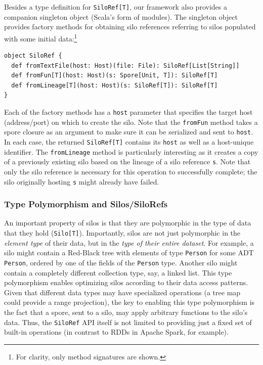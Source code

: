 \documentclass{jfp1}
\begin{document}
Besides a type definition for \verb|SiloRef[T]|, our framework also provides a
companion singleton object (Scala's form of modules). The singleton object
provides factory methods for obtaining silo references referring to silos populated
with some initial data:\footnote{For clarity, only method signatures are shown.}

\begin{lstlisting}
object SiloRef {
  def fromTextFile(host: Host)(file: File): SiloRef[List[String]]
  def fromFun[T](host: Host)(s: Spore[Unit, T]): SiloRef[T]
  def fromLineage[T](host: Host)(s: SiloRef[T]): SiloRef[T]
}
\end{lstlisting}
\noindent
Each of the factory methods has a \verb|host| parameter that specifies the
target host (address/port) on which to create the silo. Note that the
\verb|fromFun| method takes a spore closure as an argument to make sure it can
be serialized and sent to \verb|host|. In each case, the returned
\verb|SiloRef[T]| contains its \verb|host| as well as a
host-unique identifier. The \verb|fromLineage| method is
particularly interesting as it creates a copy of a previously existing silo
based on the lineage of a silo reference \verb|s|. Note that only the silo
reference is necessary for this operation to successfully complete; the silo
originally hosting \verb|s| might already have failed.

\subsubsection{Type Polymorphism and Silos/SiloRefs}

An important property of silos is that they are polymorphic in the type of data
that they hold (\verb|Silo[T]|). Importantly, silos are not just polymorphic in
the {\em element type} of their data, but in the {\em type of their entire
dataset}. For example, a silo might contain a Red-Black tree with elements of
type \verb|Person| for some ADT \verb|Person|, ordered by one of the fields of
the \verb|Person| type. Another silo might contain a completely different
collection type, say, a linked list. This type polymorphism enables optimizing
silos according to their data access patterns. Given that different data types
may have specialized operations (\eg a tree map could provide a range
projection), the key to enabling this type polymorphism is the fact that a
spore, sent to a silo, may apply arbitrary functions to the silo's data. Thus,
the \verb|SiloRef| API itself is not limited to providing just a fixed set of
built-in operations (in contrast to RDDs in Apache Spark, for example).
\end{document}
